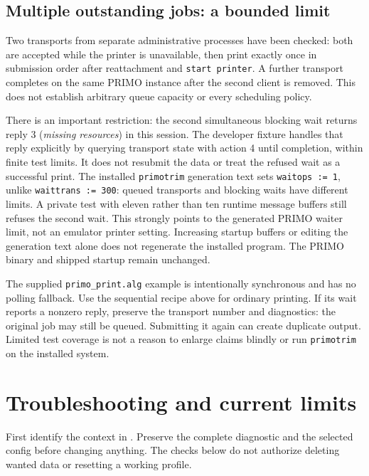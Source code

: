 \subsection{Multiple outstanding jobs: a bounded limit}

Two transports from separate administrative processes have been checked:
both are accepted while the printer is unavailable, then print exactly once
in submission order after reattachment and \texttt{start printer}. A further
transport completes on the same PRIMO instance after the second client is
removed. This does not establish arbitrary queue capacity or every scheduling
policy.

There is an important restriction: the second simultaneous blocking wait
returns reply 3 (\emph{missing resources}) in this session. The developer
fixture handles that reply explicitly by querying transport state with action
4 until completion, within finite test limits. It does not resubmit the data
or treat the refused wait as a successful print. The installed
\texttt{primotrim} generation text sets \texttt{waitops := 1}, unlike
\texttt{waittrans := 300}: queued transports and blocking waits have different
limits. A private test with eleven rather than ten runtime message buffers
still refuses the second wait. This strongly points to the generated PRIMO
waiter limit, not an emulator printer setting. Increasing startup buffers or
editing the generation text alone does not regenerate the installed program.
The PRIMO binary and shipped startup remain unchanged.

The supplied \texttt{primo\_print.alg} example is intentionally synchronous
and has no polling fallback. Use the sequential recipe above for ordinary
printing. If its wait reports a nonzero reply, preserve the transport number
and diagnostics: the original job may still be queued. Submitting it again
can create duplicate output. Limited test coverage is not a reason to enlarge
claims blindly or run \texttt{primotrim} on the installed system.

\section{Troubleshooting and current limits}\label{mips-ts-troubleshooting}

First identify the context in . Preserve the complete diagnostic and the selected config before
changing anything. The checks below do not authorize deleting wanted data or
resetting a working profile.


